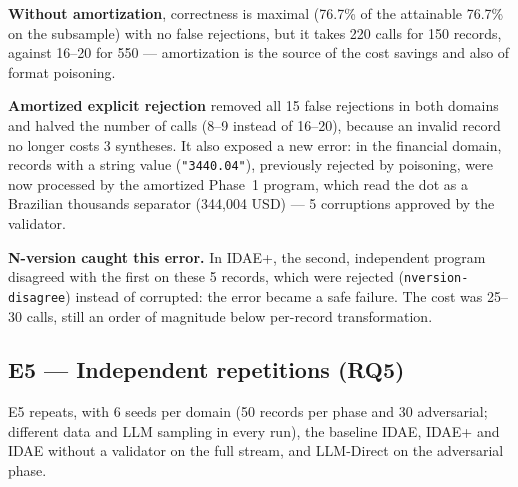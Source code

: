 \documentclass[sigconf,nonacm]{acmart}
\begin{document}
\textbf{Without amortization}, correctness is maximal (76.7\% of the attainable 76.7\% on the subsample) with no false rejections, but it takes 220 calls for 150 records, against 16--20 for 550 --- amortization is the source of the cost savings and also of format poisoning.

\textbf{Amortized explicit rejection} removed all 15 false rejections in both domains and halved the number of calls (8--9 instead of 16--20), because an invalid record no longer costs 3 syntheses. It also exposed a new error: in the financial domain, records with a string value (\texttt{"3440.04"}), previously rejected by poisoning, were now processed by the amortized Phase~1 program, which read the dot as a Brazilian thousands separator (344,004 USD) --- 5 corruptions approved by the validator.

\textbf{N-version caught this error.} In IDAE+, the second, independent program disagreed with the first on these 5 records, which were rejected (\texttt{nversion-disagree}) instead of corrupted: the error became a safe failure. The cost was 25--30 calls, still an order of magnitude below per-record transformation.

\subsection{E5 --- Independent repetitions (RQ5)}

E5 repeats, with 6 seeds per domain (50 records per phase and 30 adversarial; different data and LLM sampling in every run), the baseline IDAE, IDAE+ and IDAE without a validator on the full stream, and LLM-Direct on the adversarial phase.

\begin{table}[h]
\caption{E5 --- 6 runs per domain (mean $\pm$ standard deviation, \% of $n=280$)}
\label{tab:e5}
\end{table}
\end{document}
